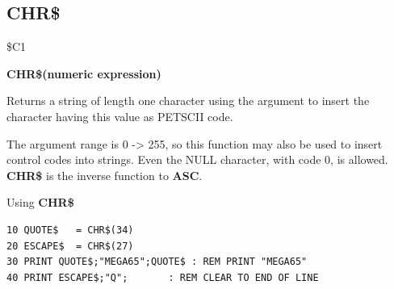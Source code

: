 \subsection{CHR\$}
\begin{description}[leftmargin=2cm,style=nextline]
\item [Token:] \$C1
\item [Format:] {\bf CHR\$(numeric expression)}
\item [Usage:] Returns a string of length one character
               using the argument to insert the character having this
               value as PETSCII code.

\item [Remarks:] The argument range is 0 -> 255, so this function may
                 also be used to insert control codes into strings.
                 Even the NULL character, with code 0, is allowed. \\
               {\bf CHR\$} is the inverse function to {\bf ASC}.
\item [Example:] Using {\bf CHR\$}
\begin{tcolorbox}[colback=black,coltext=white]
\verbatimfont{\codefont}
\begin{verbatim}
10 QUOTE$   = CHR$(34)
20 ESCAPE$  = CHR$(27)
30 PRINT QUOTE$;"MEGA65";QUOTE$ : REM PRINT "MEGA65"
40 PRINT ESCAPE$;"Q";       : REM CLEAR TO END OF LINE
\end{verbatim}
\end{tcolorbox}
\end{description}


\newpage
